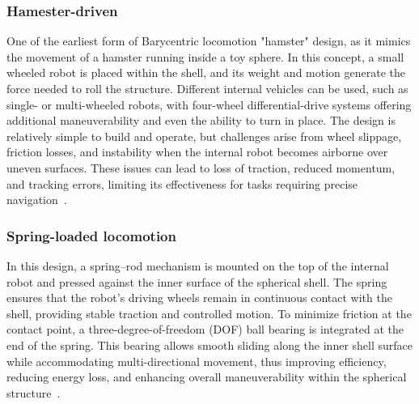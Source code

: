 \documentclass[english, bachelor, utf8]{base/thesis_telematics}
\begin{document}
\subsubsection{Hamester-driven}
One of the earliest form of Barycentric locomotion "hamster" design, as it mimics the movement of a hamster running inside a toy sphere. 
In this concept, a small wheeled robot is placed within the shell, and its weight and motion generate the force needed to roll the structure. Different internal vehicles can be used, such as single- or multi-wheeled robots, with four-wheel differential-drive systems offering additional maneuverability and even the ability to turn in place. 
The design is relatively simple to build and operate, but challenges arise from wheel slippage, friction losses, and instability when the internal robot becomes airborne over uneven surfaces. 
These issues can lead to loss of traction, reduced momentum, and tracking errors, limiting its effectiveness for tasks requiring precise navigation~\cite{flywheel_hamaster_explanation}.

\subsubsection{Spring-loaded locomotion}
In this design, a spring–rod mechanism is mounted on the top of the internal robot and pressed against the inner surface of the spherical shell. 
The spring ensures that the robot’s driving wheels remain in continuous contact with the shell, providing stable traction and controlled motion. 
To minimize friction at the contact point, a three-degree-of-freedom (DOF) ball bearing is integrated at the end of the spring. 
This bearing allows smooth sliding along the inner shell surface while accommodating multi-directional movement, thus improving efficiency, reducing energy loss, and enhancing overall maneuverability within the spherical structure~\cite{old_spring_paper,flywheel_hamaster_explanation,SpheriDrive}.
\end{document}
